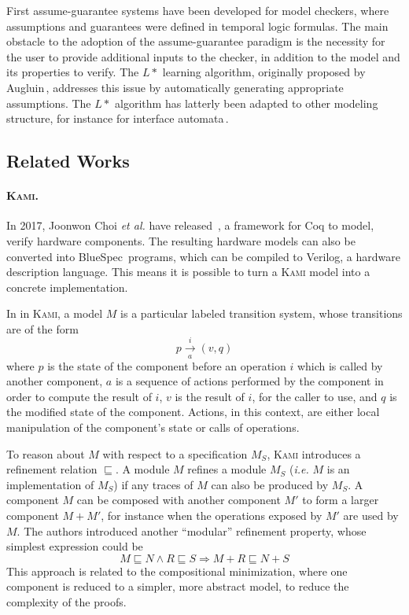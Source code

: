 First assume-guarantee systems have been developed for model checkers, where
assumptions and guarantees were defined in temporal logic formulas.
%
The main obstacle to the adoption of the assume-guarantee paradigm is the
necessity for the user to provide additional inputs to the checker, in addition
to the model and its properties to verify.
%
The \( L* \) learning algorithm, originally proposed by
Augluin\,\cite{angluin1987lstart}, addresses this issue by automatically
generating appropriate assumptions.
%
The \( L* \) algorithm has latterly been adapted to other modeling structure,
for instance for interface automata\,\cite{emmi2008assume}.

\subsection{Related Works}

\paragraph{{\scshape Kami}.}
%
In 2017, Joonwon Choi \emph{et al.} have released \,\cite{choi2017kami}, a
framework for Coq to model, verify hardware components.
%
The resulting hardware models can also be converted into
BlueSpec\,\cite{nikhil2004bluespec} programs, which can be compiled to Verilog,
a hardware description language.
%
This means it is possible to turn a {\scshape Kami} model into a concrete
implementation.

In in {\scshape Kami}, a model \( M \) is a particular labeled transition
system, whose transitions are of the form
%
\[
  p \xrightarrow[a]{i} (v, q)
\]
%
where \( p \) is the state of the component before an operation \( i \) which is
called by another component, \( a \) is a sequence of actions performed by the
component in order to compute the result of \( i \), \( v \) is the result of
\( i \), for the caller to use, and \( q \) is the modified state of the
component.
%
Actions, in this context, are either local manipulation of the component's state
or calls of operations.

To reason about \( M \) with respect to a specification \( M_S \), {\scshape
  Kami} introduces a refinement relation \( \sqsubseteq \).
%
A module \( M \) refines a module \( M_S \) (\emph{i.e.} \( M \) is an
implementation of \( M_S \)) if any traces of \( M \) can also be produced by
\( M_S \).
%
A component \( M \) can be composed with another component \( M' \) to form a
larger component \( M + M' \), for instance when the operations exposed by
\( M' \) are used by \( M \).
%
The authors introduced another ``modular'' refinement property, whose simplest
expression could be
%
\[
  M \sqsubseteq N \wedge R \sqsubseteq S \Rightarrow M + R \sqsubseteq N + S
\]
%
This approach is related to the compositional minimization, where one component
is reduced to a simpler, more abstract model, to reduce the complexity of the
proofs.

